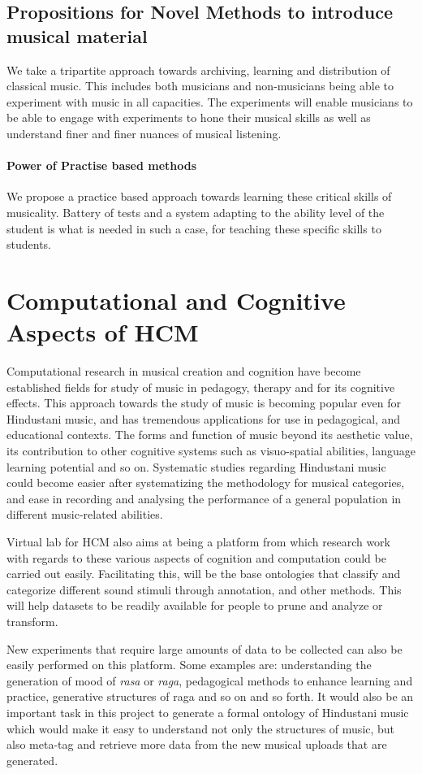 \documentclass{tufte-handout}
\begin{document}
\subsection{Propositions for Novel Methods to introduce musical material}
We take a tripartite approach towards archiving, learning and distribution of classical music. This includes both musicians and non-musicians being able to experiment with music in all capacities. The experiments will enable musicians to be able to engage with experiments to hone their musical skills as well as understand finer and finer nuances of musical listening. 
\paragraph{Power of Practise based methods} We propose a practice based approach towards learning these critical skills of musicality. Battery of tests and a system adapting to the ability level of the student is what is needed in such a case, for teaching these specific skills to students. 

\section{Computational and Cognitive Aspects of HCM}
Computational research in musical creation and cognition have become established fields for study of music in pedagogy, therapy and for its cognitive effects. This approach towards the study of music is becoming popular even for Hindustani music, and has tremendous applications for use in pedagogical, and educational contexts. The forms and function of music beyond its aesthetic value, its contribution to other cognitive systems such as visuo-spatial abilities, language learning potential and so on. Systematic studies regarding Hindustani music could become easier after systematizing the methodology for musical categories, and ease in recording and analysing the performance of a general population in different music-related abilities.  

Virtual lab for HCM also aims at being a platform from which research work with regards to these various aspects of cognition and computation could be carried out easily. Facilitating this, will be the base ontologies that classify and categorize different sound stimuli through annotation, and other methods. This will help datasets to be readily available for people to prune and analyze or transform. 

New experiments that require large amounts of data to be collected can also be easily performed on this platform. Some examples are: understanding the generation of mood of
\emph{rasa} or \emph{raga}, pedagogical
methods to enhance learning and practice, generative
structures of raga and so on and so forth. It would also be
an important task in this project to generate a formal
ontology of Hindustani music which would make it easy to
understand not only the structures of music, but also
meta-tag and retrieve more data from the new musical uploads
that are generated.
\end{document}
